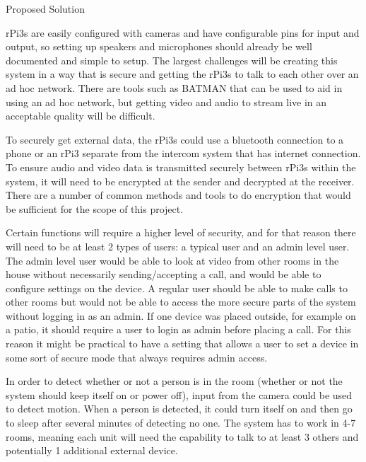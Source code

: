 \documentclass{article}
\begin{document}
\vspace{1cm}
Proposed Solution
\vspace{1cm}

rPi3s are easily configured with cameras and have configurable pins for input and output, so setting up speakers and microphones should already be well documented and simple to setup. The largest challenges will be creating this system in a way that is secure and getting the rPi3s to talk to each other over an ad hoc network. There are tools such as BATMAN that can be used to aid in using an ad hoc network, but getting video and audio to stream live in an acceptable quality will be difficult. 

To securely get external data, the rPi3s could use a bluetooth connection to a phone or an rPi3 separate from the intercom system that has internet connection. To ensure audio and video data is transmitted securely between rPi3s within the system, it will need to be encrypted at the sender and decrypted at the receiver. There are a number of common methods and tools to do encryption that would be sufficient for the scope of this project. 

Certain functions will require a higher level of security, and for that reason there will need to be at least 2 types of users: a typical user and an admin level user. The admin level user would be able to look at video from other rooms in the house without necessarily sending/accepting a call, and would be able to configure settings on the device. A regular user should be able to make calls to other rooms but would not be able to access the more secure parts of the system without logging in as an admin. If one device was placed outside, for example on a patio, it should require a user to login as admin before placing a call. For this reason it might be practical to have a setting that allows a user to set a device in some sort of secure mode that always requires admin access. 

In order to detect whether or not a person is in the room (whether or not the system should keep itself on or power off), input from the camera could be used to detect motion. When a person is detected, it could turn itself on and then go to sleep after several minutes of detecting no one. The system has to work in 4-7 rooms, meaning each unit will need the capability to talk to at least 3 others and potentially 1 additional external device.  


\vspace{1cm}
\end{document}
